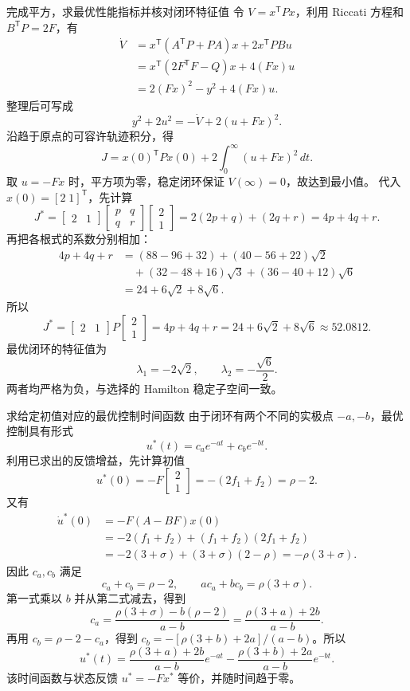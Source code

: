 \documentclass[11pt]{article}
\begin{document}
\begin{solution}
\begin{proofstep}{完成平方，求最优性能指标并核对闭环特征值}
令 $V=x^{\mathsf T}Px$，利用 Riccati 方程和 $B^{\mathsf T}P=2F$，有
\[
 \begin{aligned}
 \dot V
 &=x^{\mathsf T}(A^{\mathsf T}P+PA)x+2x^{\mathsf T}PBu\\
 &=x^{\mathsf T}(2F^{\mathsf T}F-Q)x+4(Fx)u\\
 &=2(Fx)^2-y^2+4(Fx)u.
 \end{aligned}
\]
整理后可写成
\[
 y^2+2u^2=-\dot V+2(u+Fx)^2.
\]
沿趋于原点的可容许轨迹积分，得
\[
 J=x(0)^{\mathsf T}Px(0)+2\int_0^\infty(u+Fx)^2\,dt.
\]
取 $u=-Fx$ 时，平方项为零，稳定闭环保证 $V(\infty)=0$，故达到最小值。
代入 $x(0)=[2\;1]^{\mathsf T}$，先计算
\[
 J^*=\begin{bmatrix}2&1\end{bmatrix}
 \begin{bmatrix}p&q\\q&r\end{bmatrix}\begin{bmatrix}2\\1\end{bmatrix}
 =2(2p+q)+(2q+r)=4p+4q+r.
\]
再把各根式的系数分别相加：
\[
 \begin{aligned}
 4p+4q+r
 &=(88-96+32)+(40-56+22)\sqrt2\\
 &\quad +(32-48+16)\sqrt3+(36-40+12)\sqrt6\\
 &=24+6\sqrt2+8\sqrt6.
 \end{aligned}
\]
所以
\[
 \boxed{J^*=\begin{bmatrix}2&1\end{bmatrix}P
 \begin{bmatrix}2\\1\end{bmatrix}=4p+4q+r
 =24+6\sqrt2+8\sqrt6\approx52.0812.}
\]
最优闭环的特征值为
\[
 \boxed{\lambda_1=-2\sqrt2,\qquad
 \lambda_2=-\frac{\sqrt6}{2}.}
\]
两者均严格为负，与选择的 Hamilton 稳定子空间一致。
\end{proofstep}
\tcbbreak
\begin{proofstep}{求给定初值对应的最优控制时间函数}
由于闭环有两个不同的实极点 $-a,-b$，最优控制具有形式
\[
 u^*(t)=c_a e^{-at}+c_b e^{-bt}.
\]
利用已求出的反馈增益，先计算初值
\[
 u^*(0)=-F\begin{bmatrix}2\\1\end{bmatrix}
 =-(2f_1+f_2)=\rho-2.
\]
又有
\[
 \begin{aligned}
 \dot u^*(0)&=-F(A-BF)x(0)\\
 &=-2(f_1+f_2)+(f_1+f_2)(2f_1+f_2)\\
 &=-2(3+\sigma)+(3+\sigma)(2-\rho)
 =-\rho(3+\sigma).
 \end{aligned}
\]
因此 $c_a,c_b$ 满足
\[
 c_a+c_b=\rho-2,\qquad ac_a+bc_b=\rho(3+\sigma).
\]
第一式乘以 $b$ 并从第二式减去，得到
\[
 c_a=\frac{\rho(3+\sigma)-b(\rho-2)}{a-b}
 =\frac{\rho(3+a)+2b}{a-b}.
\]
再用 $c_b=\rho-2-c_a$，得到
$c_b=-[\rho(3+b)+2a]/(a-b)$。所以
\[
 \boxed{u^*(t)=
 \frac{\rho(3+a)+2b}{a-b}e^{-at}
 -\frac{\rho(3+b)+2a}{a-b}e^{-bt}.}
\]
该时间函数与状态反馈 $u^*=-Fx^*$ 等价，并随时间趋于零。
\end{proofstep}
\end{solution}
\end{document}
